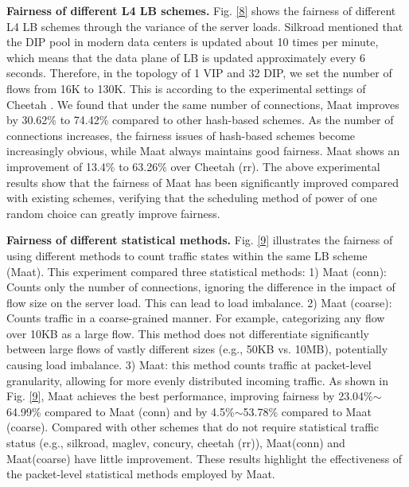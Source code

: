  \textbf{Fairness of different L4 LB schemes.} Fig. \ref{8} shows the fairness of different L4 LB schemes through the variance of the server loads. Silkroad \cite{miao2017silkroad} mentioned that the DIP pool in modern data centers is updated about 10 times per minute, which means that the data plane of LB is updated approximately every 6 seconds. Therefore, in the topology of 1 VIP and 32 DIP, we set the number of flows from 16K to 130K. This is according to the experimental settings of Cheetah \cite{barbette2021cheetah}. We found that under the same number of connections, Maat improves by 30.62\% to 74.42\% compared to other hash-based schemes. As the number of connections increases, the fairness issues of hash-based schemes become increasingly obvious, while Maat always maintains good fairness. Maat shows an improvement of 13.4\% to 63.26\% over Cheetah (rr). The above experimental results show that the fairness of Maat has been significantly improved compared with existing schemes, verifying that the scheduling method of power of one random choice can greatly improve fairness.
 
 \textbf{Fairness of different statistical methods.} Fig. \ref{9} illustrates the fairness of using different methods to count traffic states within the same LB scheme (Maat). This experiment compared three statistical methods: 1) Maat (conn): Counts only the number of connections, ignoring the difference in the impact of flow size on the server load. This can lead to load imbalance. 2) Maat (coarse): Counts traffic in a coarse-grained manner. For example, categorizing any flow over 10KB as a large flow. This method does not differentiate significantly between large flows of vastly different sizes (e.g., 50KB vs. 10MB), potentially causing load imbalance. 3) Maat: this method counts traffic at packet-level granularity, allowing for more evenly distributed incoming traffic. As shown in Fig. \ref{9}, Maat achieves the best performance, improving fairness by 23.04\%$\sim$64.99\% compared to Maat (conn) and by 4.5\%$\sim$53.78\% compared to Maat (coarse). Compared with other schemes that do not require statistical traffic status (e.g., silkroad, maglev, concury, cheetah (rr)), Maat(conn) and Maat(coarse) have little improvement. These results highlight the effectiveness of the packet-level statistical methods employed by Maat.
 
